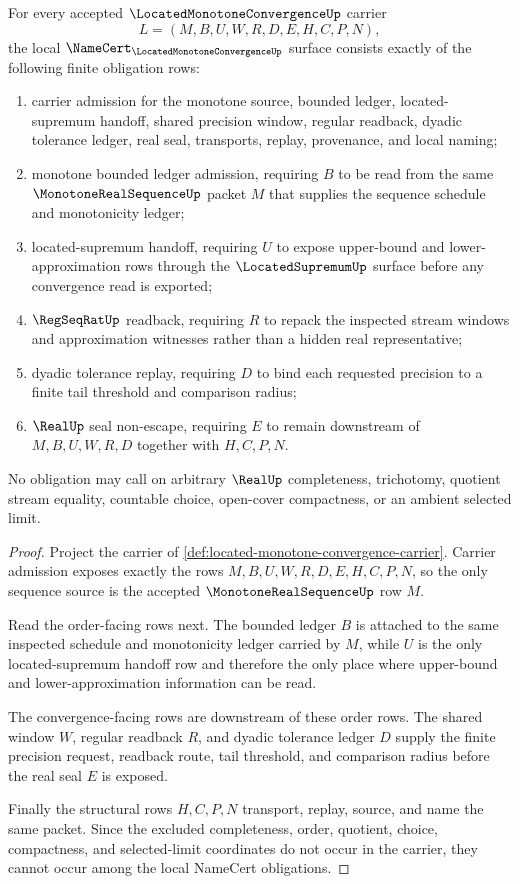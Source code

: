 \begin{theorem}
\label{thm:located-monotone-convergence-namecert-obligations}
For every accepted $\LocatedMonotoneConvergenceUp$ carrier
$$
L=(M,B,U,W,R,D,E,H,C,P,N),
$$
the local $\NameCert_{\LocatedMonotoneConvergenceUp}$ surface consists exactly of the following finite obligation rows:
\begin{enumerate}
\item carrier admission for the monotone source, bounded ledger, located-supremum handoff, shared precision window, regular readback, dyadic tolerance ledger, real seal, transports, replay, provenance, and local naming;
\item monotone bounded ledger admission, requiring $B$ to be read from the same $\MonotoneRealSequenceUp$ packet $M$ that supplies the sequence schedule and monotonicity ledger;
\item located-supremum handoff, requiring $U$ to expose upper-bound and lower-approximation rows through the $\LocatedSupremumUp$ surface before any convergence read is exported;
\item $\RegSeqRatUp$ readback, requiring $R$ to repack the inspected stream windows and approximation witnesses rather than a hidden real representative;
\item dyadic tolerance replay, requiring $D$ to bind each requested precision to a finite tail threshold and comparison radius;
\item $\RealUp$ seal non-escape, requiring $E$ to remain downstream of $M,B,U,W,R,D$ together with $H,C,P,N$.
\end{enumerate}
No obligation may call on arbitrary $\RealUp$ completeness, trichotomy, quotient stream equality, countable choice, open-cover compactness, or an ambient selected limit.
\end{theorem}
\begin{proof}
Project the carrier of \autoref{def:located-monotone-convergence-carrier}. Carrier admission exposes exactly the rows $M,B,U,W,R,D,E,H,C,P,N$, so the only sequence source is the accepted $\MonotoneRealSequenceUp$ row $M$.

Read the order-facing rows next. The bounded ledger $B$ is attached to the same inspected schedule and monotonicity ledger carried by $M$, while $U$ is the only located-supremum handoff row and therefore the only place where upper-bound and lower-approximation information can be read.

The convergence-facing rows are downstream of these order rows. The shared window $W$, regular readback $R$, and dyadic tolerance ledger $D$ supply the finite precision request, readback route, tail threshold, and comparison radius before the real seal $E$ is exposed.

Finally the structural rows $H,C,P,N$ transport, replay, source, and name the same packet. Since the excluded completeness, order, quotient, choice, compactness, and selected-limit coordinates do not occur in the carrier, they cannot occur among the local NameCert obligations.
\end{proof}

